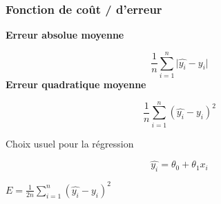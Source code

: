 \begin{frame}
  \frametitle{Fonction de coût / d'erreur}
  \begin{minipage}[l]{0.5\textwidth}
    \textbf{Erreur absolue moyenne}

    \[
      \frac{1}{n}\sum_{i=1}^n\lvert\hat{y_i} - y_i\rvert
    \]
    \textbf{Erreur quadratique moyenne}

    \[
      \frac{1}{n}\sum_{i=1}^n( \hat{y_i} - y_i )^2
    \]
  \end{minipage}\hfill
  \begin{minipage}[l]{0.5\textwidth}
  \end{minipage}\hfill
\end{frame}

\begin{frame}{Choix usuel pour la régression}
  \begin{minipage}[l]{0.49\linewidth}
    \[
      \hat{y_i} = \theta_0 + \theta_1 x_i
    \]
  \end{minipage}\hfill
  \begin{minipage}[l]{0.49\linewidth}
    $\boxed{E = \frac{1}{2n}\sum_{i=1}^n( \hat{y_i} - y_i )^2}$ \\
  \end{minipage}\hfill
\end{frame}
